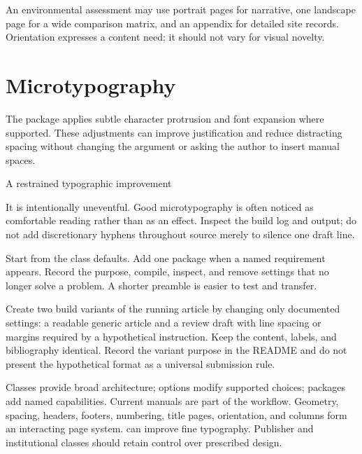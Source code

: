 \begin{scienceinpractice}
An environmental assessment may use portrait pages for narrative, one
landscape page for a wide comparison matrix, and an appendix for detailed site
records. Orientation expresses a content need; it should not vary for visual
novelty.
\end{scienceinpractice}

\section{Microtypography}

The  package applies subtle character protrusion and font
expansion where supported. These adjustments can improve justification and
reduce distracting spacing without changing the argument or asking the author
to insert manual spaces.

\begin{latexcode}{A restrained typographic improvement}
\usepackage{microtype}
\end{latexcode}

It is intentionally uneventful. Good microtypography is often noticed as
comfortable reading rather than as an effect. Inspect the build log and output;
do not add discretionary hyphens throughout source merely to silence one draft
line.

\begin{goodpractice}
Start from the class defaults. Add one package when a named requirement appears.
Record the purpose, compile, inspect, and remove settings that no longer solve
a problem. A shorter preamble is easier to test and transfer.
\end{goodpractice}

\chapterproject

\begin{miniproject}
Create two build variants of the running article by changing only documented
settings: a readable generic article and a review draft with line spacing or
margins required by a hypothetical instruction. Keep the content, labels, and
bibliography identical. Record the variant purpose in the README and do not
present the hypothetical format as a universal submission rule.
\end{miniproject}

\chaptersummary

Classes provide broad architecture; options modify supported choices; packages
add named capabilities. Current manuals are part of the workflow. Geometry,
spacing, headers, footers, numbering, title pages, orientation, and columns form
an interacting page system.  can improve fine typography.
Publisher and institutional classes should retain control over prescribed
design.


